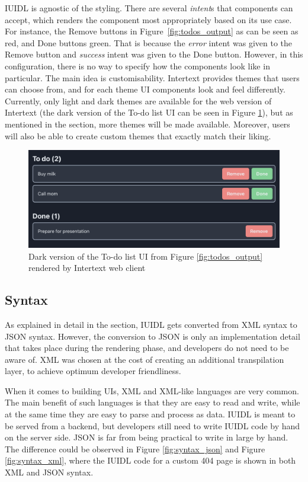 IUIDL is agnostic of the styling. There are several \textit{intent}s that components can accept, which renders the component most appropriately based on its use case. For instance, the Remove buttons in Figure~\ref{fig:todos_output} as can be seen as red, and Done buttons green. That is because the \textit{error} intent was given to the Remove button and \textit{success} intent was given to the Done button. However, in this configuration, there is no way to specify how the components look like in particular. The main idea is customisability. Intertext provides themes that users can choose from, and for each theme UI components look and feel differently. Currently, only light and dark themes are available for the web version of Intertext (the dark version of the To-do list UI can be seen in Figure \ref{fig:todos_output_dark}), but as mentioned in the  section, more themes will be made available. Moreover, users will also be able to create custom themes that exactly match their liking.

\begin{figure}
  \centering
  \includegraphics[width=13cm]{thesis/paper/images/todos_dark.png}
  \caption{Dark version of the To-do list UI from Figure \ref{fig:todos_output} rendered by Intertext web client}%
  \label{fig:todos_output_dark}%
\end{figure}

\subsection{Syntax}

As explained in detail in the  section, IUIDL gets converted from XML syntax to JSON syntax. However, the conversion to JSON is only an implementation detail that takes place during the rendering phase, and developers do not need to be aware of. XML was chosen at the cost of creating an additional transpilation layer, to achieve optimum developer friendliness. 

When it comes to building UIs, XML and XML-like languages are very common. The main benefit of such languages is that they are easy to read and write, while at the same time they are easy to parse and process as data. IUIDL is meant to be served from a backend, but developers still need to write IUIDL code by hand on the server side. JSON is far from being practical to write in large by hand. The difference could be observed in Figure \ref{fig:syntax_json} and Figure \ref{fig:syntax_xml}, where the IUIDL code for a custom 404 page is shown in both XML and JSON syntax.

